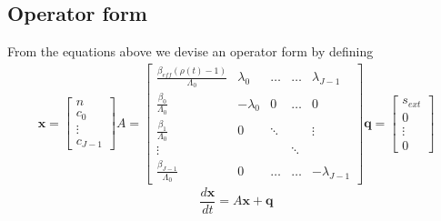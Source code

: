 \documentclass[11pt,letterpaper,notitlepage]{article}
\numberwithin{equation}{section}
\begin{document}
\subsection{Operator form}
From the equations above we devise an operator form by defining
\begin{equation*}
\begin{aligned}
	\mathbf{x} = 
	\begin{bmatrix}
		n \\
		c_0 \\
		\vdots \\
		c_{J-1}
	\end{bmatrix}
	A = 
	\begin{bmatrix}
		\frac{\beta_{eff} ( \rho (t) - 1)}{\Lambda_0} & \lambda_0 & \dots & \dots & \lambda_{J-1} \\
		\frac{\beta_{0}}{\Lambda_0} & -\lambda_0 & 0 & \dots & 0\\ 
		\frac{\beta_{1}}{\Lambda_0} & 0 & \ddots &   & \vdots\\
		\vdots & & & \ddots \\
		\frac{\beta_{J-1}}{\Lambda_0} & 0 &\dots & \dots & -\lambda_{J-1}
	\end{bmatrix}
	\mathbf{q} = 
	\begin{bmatrix}
		s_{ext} \\
		0 \\
		\vdots \\
		0
	\end{bmatrix}
\end{aligned}
\end{equation*}
\begin{equation}
	\frac{d\mathbf{x}}{dt} = A \mathbf{x} + \mathbf{q}
\end{equation}
\end{document}
